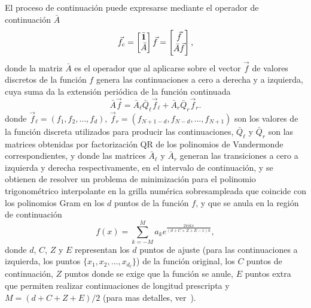 El proceso de continuación puede expresarse mediante el operador de continuación $\bar{A}$
\begin{equation}
\vec{f}_c= 
\begin{bmatrix}
    \bar{\mathbf{1}} \\
    \bar{A}  \\
\end{bmatrix}
\vec{f}=
\begin{bmatrix}
    \vec{f}\\
    \bar{A} \vec{f}  \\
\end{bmatrix}
,
\label{eq:FCopA}
\end{equation}
donde la matriz $\bar{A}$ es el operador que al aplicarse sobre 
el vector $\vec{f}$ de valores discretos de la función $f$ 
genera las continuaciones a cero a derecha y a izquierda, cuya suma 
da la extensión periódica de la función continuada
\begin{equation}
    \bar{A}  \vec{f} = \bar{A}_{\ell} \bar{Q}_{\ell}  \vec{f}_{\ell} 
+\bar{A}_{r} \bar{Q}_{r}  \vec{f}_{r}.
\label{eq:Acont}
\end{equation}
donde $\vec{f}_{\ell}=(f_1,f_2,\ldots,f_d)$, 
 $\vec{f}_{r}=(f_{N+1-d},f_{N-d},\ldots,f_{N+1})$ 
 son los valores de la función discreta utilizados para producir las continuaciones, $\bar{Q}_{\ell} $ y $\bar{Q}_{r}$ son las matrices obtenidas por factorización 
QR de los polinomios de Vandermonde correspondientes, y donde las matrices $\bar{A}_{\ell}$ 
y $\bar{A}_{r}$ generan las transiciones a cero a izquierda y derecha respectivamente, en el intervalo de continuación, 
y se obtienen de resolver un problema de minimización 
para el polinomio trigonométrico interpolante en la grilla numérica sobresampleada 
que coincide con los polinomios Gram en los $d$ puntos de la función $f$, y 
que se anula en la región de continuación
\begin{equation}
f(x)=\sum_{k=-M}^{M} a_k e^{\frac{2\pi i k x}{(d+C+Z+E-1)h}},
\label{eq:fccontint}
\end{equation}
donde $d$, $C$, $Z$ y $E$ representan los $d$ puntos de ajuste (para las continuaciones a izquierda, los puntos $\{x_{1},x_{2},\ldots, x_{d_{\ell}} \}$) de la función original, 
los $C$ puntos de continuación, $Z$ puntos donde se exige que la función se anule, $E$ 
puntos extra que permiten realizar continuaciones de longitud prescripta 
y $M=(d+C+Z+E)/2$ (para mas detalles, ver~\cite{Amlani2016}).

